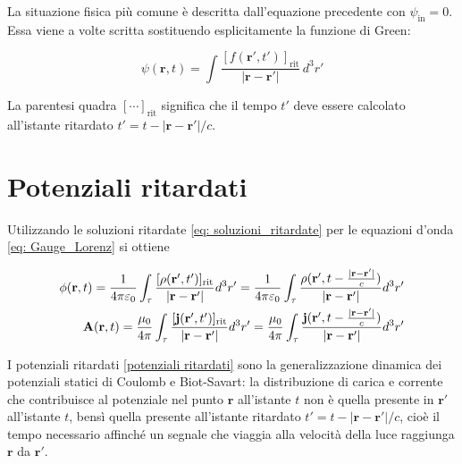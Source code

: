 La situazione fisica più comune è descritta dall'equazione precedente con $\psi_{\text{in}} = 0$. Essa viene a volte scritta sostituendo esplicitamente la funzione di Green:

\begin{tcolorbox}[colback=yellow!10!white, colframe=orange!70!black, boxrule=0.8pt]
\begin{equation} \label{eq: soluzioni_ritardate}
    \psi(\mathbf{r}, t) = \int \frac{\left[ f(\mathbf{r'}, t') \right]_{\text{rit}}}{|\mathbf{r} - \mathbf{r'}|} \, d^3r'
\end{equation}
\end{tcolorbox}

La parentesi quadra $[\cdots]_{\text{rit}}$ significa che il tempo $t'$ deve essere calcolato all'istante ritardato $t' = t - |\mathbf{r} - \mathbf{r'}|/c$.

\section{Potenziali ritardati}

Utilizzando le soluzioni ritardate \ref{eq: soluzioni_ritardate} per le equazioni d'onda \ref{eq: Gauge_Lorenz} si ottiene 

\begin{tcolorbox}[colback=yellow!10!white, colframe=orange!70!black, boxrule=0.8pt]
\begin{align} \label{potenziali ritardati}
    \phi(\mathbf{r},t) = \frac{1}{4\pi \varepsilon_0} \int_{\tau} \frac{[\rho (\mathbf{r'}, t')]_{\text{rit}}}{|\mathbf{r} - \mathbf{r'}|} d^3r' = \frac{1}{4\pi \varepsilon_0} \int_{\tau} \frac{\rho (\mathbf{r'}, t - \frac{|\mathbf{r} - \mathbf{r}'|}{c})}{|\mathbf{r} - \mathbf{r'}|} d^3r'\\
    \mathbf{A}(\mathbf{r},t) = \frac{\mu_0}{4\pi} \int_{\tau} \frac{[\mathbf{j}(\mathbf{r}', t')]_{\text{rit}}}{|\mathbf{r} - \mathbf{r'}|} d^3 r' = \frac{\mu_0}{4\pi} \int_{\tau} \frac{\mathbf{j}(\mathbf{r}', t - \frac{|\mathbf{r} - \mathbf{r}'|}{c})}{|\mathbf{r} - \mathbf{r'}|} d^3 r' 
\end{align}
\end{tcolorbox}

I potenziali ritardati \ref{potenziali ritardati} sono la generalizzazione dinamica dei potenziali statici di Coulomb e Biot-Savart: la distribuzione di carica e corrente che contribuisce al potenziale nel punto $\mathbf{r}$ all'istante $t$ non è quella presente in $\mathbf{r'}$ all'istante $t$, bensì quella presente all'istante ritardato $t' = t - |\mathbf{r} - \mathbf{r'}|/c$, cioè il tempo necessario affinché un segnale che viaggia alla velocità della luce raggiunga $\mathbf{r}$ da $\mathbf{r'}$.\\

